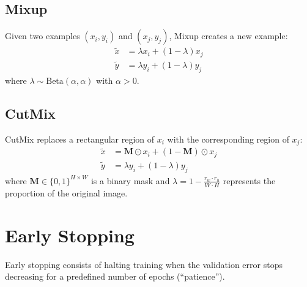 \subsection{Mixup}

\begin{keyformulas}[title=\textbf{Mixup}]
Given two examples $(x_i, y_i)$ and $(x_j, y_j)$, Mixup
\cite{zhang2018mixup} creates a new example:
\begin{align}
\tilde{x} &= \lambda x_i + (1 - \lambda) x_j \\
\tilde{y} &= \lambda y_i + (1 - \lambda) y_j
\end{align}
where $\lambda \sim \text{Beta}(\alpha, \alpha)$ with $\alpha > 0$.
\end{keyformulas}

\subsection{CutMix}

\begin{keyformulas}[title=\textbf{CutMix}]
CutMix \cite{yun2019cutmix} replaces a rectangular region of $x_i$ with
the corresponding region of $x_j$:
\begin{align}
\tilde{x} &= \mathbf{M} \odot x_i + (1 - \mathbf{M}) \odot x_j \\
\tilde{y} &= \lambda y_i + (1 - \lambda) y_j
\end{align}
where $\mathbf{M} \in \{0, 1\}^{H \times W}$ is a binary mask and
$\lambda = 1 - \frac{r_w \cdot r_h}{W \cdot H}$ represents the proportion
of the original image.
\end{keyformulas}

\section{Early Stopping}
\label{sec:early-stopping}

\begin{definition}
Early stopping consists of halting training when the validation error
stops decreasing for a predefined number of epochs
(``patience'').
\end{definition}

